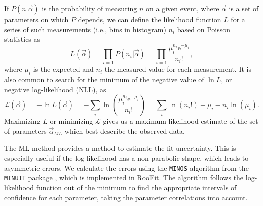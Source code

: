 \documentclass[headings=standardclasses,headings=big,oneside,a4paper,openany,12pt]{scrbook}
\begin{document}
If $P(n\vert\vec \alpha)$ is the probability of measuring $n$ on a given event, where $\vec \alpha$ is a set of parameters on which $P$ depends, we can define the likelihood function $L$ for a series of such measurements (i.e., bins in histogram) $n_i$ based on Poisson statistics as
\begin{equation}
\label{eq:ML}
L(\vec \alpha) = \prod_{i=1} P(n_i|\vec \alpha) = \prod_{i=1} \frac{\mu_i^{n_i}\mathrm{e}^{-\mu_i}}{n_i!},
\end{equation}
where $\mu_i$ is the expected and $n_i$ the measured value for each measurement. It is also common to search for the minimum of the negative value of $\ln L$, or negative log-likelihood (NLL), as
\begin{equation}
\label{eq:NLL}
\mathcal{L}(\vec \alpha) = -\ln L(\vec \alpha) = -\sum_{i}\ln \left(\frac{\mu_i^{n_i}\mathrm{e}^{-\mu_i}}{n_i!}\right) = \sum_{i}\ln(n_i!) + \mu_i - n_i\ln(\mu_i).
\end{equation}
Maximizing $L$ or minimizing $\mathcal{L}$ gives us a maximum likelihood estimate of the set of parameters $\vec \alpha_{ML}$ which best describe the observed data. 

The ML method provides a method to estimate the fit uncertainty. This is especially useful if the log-likelihood has a non-parabolic shape, which leads to asymmetric errors. We calculate the errors using the \texttt{MINOS} algorithm from the \texttt{MINUIT} package \cite{James:1994vla}, which is implemented in RooFit. The algorithm follows the log-likelihood function out of the minimum to find the appropriate intervals of confidence for each parameter, taking the parameter correlations into account. 
\end{document}
